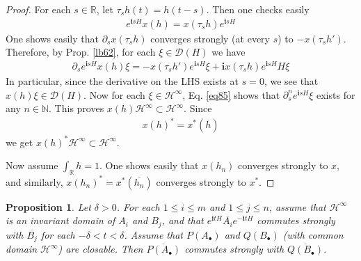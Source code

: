 \documentclass[12pt,b5paper,notitlepage]{article}
\theoremstyle{definition}
\theoremstyle{plain}
\newtheorem{pp}[df]{Proposition}
\newcommand{\mc}{\mathcal}
\newcommand{\ovl}{\overline}
\newcommand{\Dom}{\scr{D}}
\newcommand{\scr}{\mathscr}
\newcommand{\im}{\mathbf{i}}
\newcommand{\blt}{\bullet}
\newcommand{\Nbb}{\mathbb N}
\newcommand{\Rbb}{\mathbb R}
\numberwithin{equation}{section}
\begin{document}
\begin{proof}
For each $s\in\Rbb$, let $\tau_sh(t)=h(t-s)$. Then one checks easily
\begin{align}
e^{\im sH}x(h)=x(\tau_sh)e^{\im sH}
\end{align} 
One shows easily that $\partial_s x(\tau_sh)$ converges strongly (at every $s$) to $-x(\tau_sh')$. Therefore, by Prop. \ref{lb62}, for each $\xi\in\Dom(H)$ we have
\begin{align}\label{eq85}
\partial_se^{\im sH}x(h)\xi=-x(\tau_sh')e^{\im sH}\xi+\im x(\tau_sh)e^{\im sH}H\xi
\end{align}
In particular, since the derivative on the LHS exists at $s=0$, we see that $x(h)\xi\in\Dom(H)$. Now for each $\xi\in\mc H^\infty$, Eq. \eqref{eq85} shows that $\partial_s^ne^{\im sH}\xi$ exists for any $n\in\Nbb$. This proves $x(h)\mc H^\infty\subset\mc H^\infty$. Since
\begin{align*}
x(h)^*=x^*(\ovl h)
\end{align*}
we get $x(h)^*\mc H^\infty\subset\mc H^\infty$.

Now assume $\int_\Rbb h=1$. One shows easily that $x(h_n)$ converges strongly to $x$, and similarly, $x(h_n)^*=x^*(\ovl{h_n})$ converges strongly to $x^*$.
\end{proof}



\begin{pp}\label{lb68}
Let $\delta>0$. For each $1\leq i\leq m$ and $1\leq j\leq n$, assume that $\mc H^\infty$ is an invariant domain of $A_i$ and $B_j$, and that $e^{\im tH}\ovl{A_i}e^{-\im tH}$ commutes strongly with $\ovl{B_j}$ for each $-\delta<t<\delta$. Assume that $P(A_\blt)$ and $Q(B_\blt)$ (with common domain $\mc H^\infty$) are closable. Then $\ovl{P(A_\blt)}$ commutes strongly with $\ovl{Q(B_\blt)}$. 
\end{pp}
\end{document}
